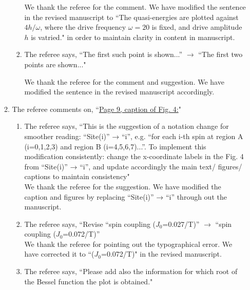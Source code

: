\documentclass[aps,prb,reprint,showpacs,floatfix,superscriptaddress, onecolumn, nofootinbib, 10pt]{revtex4-2}
\newcommand{\response}[1]{{\color{black}#1}} %
\newcommand{\comment}[1]{{\color{blue}#1}} %
\begin{document}
\begin{enumerate}
\begin{enumerate}
\begin{enumerate}
			\response{We thank the referee for the comment. We have modified the sentence in the revised manuscript to ``The quasi-energies are plotted against $4h/\omega$, where the drive frequency $\omega=20$ is fixed, and drive amplitude $h$ is vatried." in order to maintain clarity in content in manuscript.}\\
			
			\item The referee says, \comment{``The first such point is shown...” $\rightarrow$ “The first two points are shown..."}
			
			\response{We thank the referee for the comment and suggestion. We have modified the sentence in the revised manuscript accordingly.}
		\end{enumerate}
	
		\item The referee comments on, \comment{``\underline{Page 9, caption of Fig. 4:}"}
		\begin{enumerate}
			\item The referee says, \comment{``This is the suggestion of a notation change for smoother reading: “Site(i)” → “i”, 
			e.g. “for each i-th spin at region A (i=0,1,2,3) and region B (i=4,5,6,7)...”. To implement this modification consistently: change the x-coordinate labels in the Fig. 4 from “Site(i)” → “i”, and update accordingly the main text/ figures/ captions to
			maintain consistency"}\\
		
			\response{We thank the referee for the suggestion. We have modified the caption and figures by replacing ``Site(i)” → ``i” through out the manuscript.}
			\item The referee says, \comment{``Revise “spin coupling ($J_0$=0.027/T)” $\rightarrow$ “spin coupling ($J_0$=0.072/T)”}\\
			
			\response{We thank the referee for pointing out the typographical error. We have corrected it to ``($J_0$=0.072/T)" in the revised manuscript.}\\
			\item The referee says, \comment{``Please add also the information for which root of the Bessel function the plot is obtained."}\\
			

\end{enumerate}
\end{enumerate}
\end{enumerate}
\end{document}
